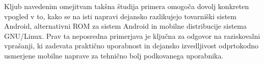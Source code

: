 \documentclass[a4paper,12pt,openright]{book}
\begin{document}
Kljub navedenim omejitvam takšna študija primera omogoča dovolj konkreten vpogled v to, kako se na isti napravi dejansko razlikujejo tovarniški sistem Android, alternativni ROM za sistem Android in mobilne distribucije sistema GNU/Linux.
Prav ta neposredna primerjava je ključna za odgovor na raziskovalni vprašanji, ki zadevata praktično uporabnost in dejansko izvedljivost odprtokodno usmerjene mobilne naprave za tehnično bolj podkovanega uporabnika.





\printbibliography[heading=bibintoc,title={Literatura}]
\end{document}
